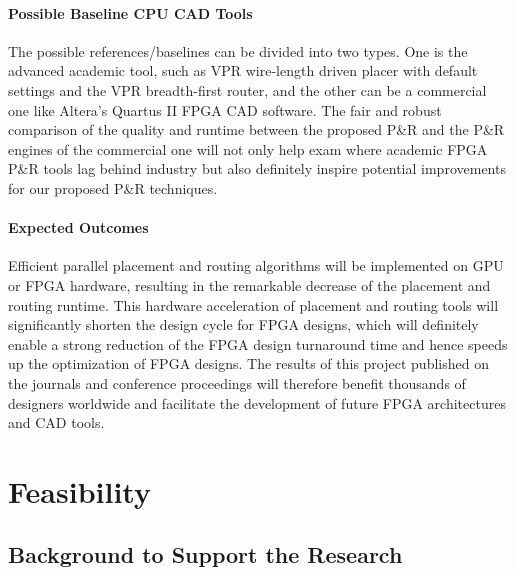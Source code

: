 \documentclass[a4paper,oneside,12pt]{article}
\begin{document}
\paragraph{Possible Baseline CPU CAD Tools}
The possible references/baselines can be divided into two types. One is the advanced academic tool, such as VPR wire-length driven placer with default settings and the VPR breadth-first router, and the other can be a commercial one like Altera's Quartus II FPGA CAD software.
The fair and robust comparison of the quality and runtime between the proposed P\&R and the P\&R engines of the commercial one will not only help exam where academic FPGA P\&R tools lag behind industry but also definitely inspire potential improvements for our proposed P\&R techniques.

\paragraph{Expected Outcomes}
Efficient parallel placement and routing algorithms will be implemented on GPU or FPGA hardware, resulting in the remarkable decrease of the placement and routing runtime. This hardware acceleration of placement and routing tools will significantly shorten the design cycle for FPGA designs, which will definitely enable a strong reduction of the FPGA design turnaround time and hence speeds up the optimization of FPGA designs. The results of this project published on the journals and conference proceedings will therefore benefit thousands of designers worldwide and facilitate the development of future FPGA architectures and CAD tools.

\section{Feasibility}


\subsection{Background to Support the Research}
\end{document}
